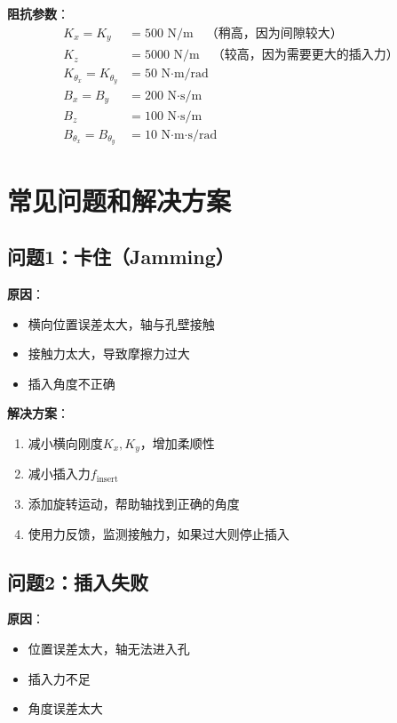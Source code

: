 \documentclass[12pt,a4paper]{article}
\begin{document}
\textbf{阻抗参数}：
\begin{align}
K_x = K_y &= 500 \text{ N/m} \quad \text{（稍高，因为间隙较大）} \\
K_z &= 5000 \text{ N/m} \quad \text{（较高，因为需要更大的插入力）} \\
K_{\theta_x} = K_{\theta_y} &= 50 \text{ N·m/rad} \\
B_x = B_y &= 200 \text{ N·s/m} \\
B_z &= 100 \text{ N·s/m} \\
B_{\theta_x} = B_{\theta_y} &= 10 \text{ N·m·s/rad}
\end{align}

\section{常见问题和解决方案}

\subsection{问题1：卡住（Jamming）}

\textbf{原因}：
\begin{itemize}
\item 横向位置误差太大，轴与孔壁接触
\item 接触力太大，导致摩擦力过大
\item 插入角度不正确
\end{itemize}

\textbf{解决方案}：
\begin{enumerate}
\item 减小横向刚度$K_x, K_y$，增加柔顺性
\item 减小插入力$f_{\text{insert}}$
\item 添加旋转运动，帮助轴找到正确的角度
\item 使用力反馈，监测接触力，如果过大则停止插入
\end{enumerate}

\subsection{问题2：插入失败}

\textbf{原因}：
\begin{itemize}
\item 位置误差太大，轴无法进入孔
\item 插入力不足
\item 角度误差太大
\end{itemize}
\end{document}

